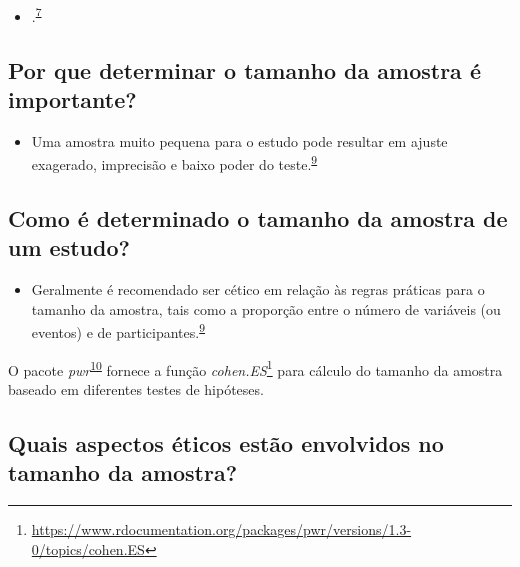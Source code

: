 \documentclass[
  a4paper,
]{book}
\providecommand{\tightlist}{%
  \setlength{\itemsep}{0pt}\setlength{\parskip}{0pt}}
\renewcommand{\href}[2]{#2\footnote{\url{#1}}}
\newenvironment{infobox}[1]
  {
  \begin{itemize}
  \renewcommand{\labelitemi}{
    \raisebox{-.7\height}[0pt][0pt]{
      {\setkeys{Gin}{width=3em,keepaspectratio}
        \texttt{[image: \#1]}}
    }
  }
  \setlength{\fboxsep}{1em}
  \begin{blackbox}
  \item
  }
  {
  \end{blackbox}
  \end{itemize}
  }
\begin{document}
\begin{itemize}
\tightlist
\item
  .\textsuperscript{\protect\hyperlink{ref-Banerjee2010}{7}}
\end{itemize}

\hypertarget{por-que-determinar-o-tamanho-da-amostra-uxe9-importante}{%
\subsection{Por que determinar o tamanho da amostra é importante?}\label{por-que-determinar-o-tamanho-da-amostra-uxe9-importante}}

\begin{itemize}
\tightlist
\item
  Uma amostra muito pequena para o estudo pode resultar em ajuste exagerado, imprecisão e baixo poder do teste.\textsuperscript{\protect\hyperlink{ref-van2022a}{9}}
\end{itemize}

\hypertarget{como-uxe9-determinado-o-tamanho-da-amostra-de-um-estudo}{%
\subsection{Como é determinado o tamanho da amostra de um estudo?}\label{como-uxe9-determinado-o-tamanho-da-amostra-de-um-estudo}}

\begin{itemize}
\tightlist
\item
  Geralmente é recomendado ser cético em relação às regras práticas para o tamanho da amostra, tais como a proporção entre o número de variáveis (ou eventos) e de participantes.\textsuperscript{\protect\hyperlink{ref-van2022a}{9}}
\end{itemize}

\begin{infobox}{images/Rlogo}
O pacote \emph{pwr}\textsuperscript{\protect\hyperlink{ref-pwr}{10}} fornece a função \href{https://www.rdocumentation.org/packages/pwr/versions/1.3-0/topics/cohen.ES}{\emph{cohen.ES}} para cálculo do tamanho da amostra baseado em diferentes testes de hipóteses.

\end{infobox}

\hypertarget{quais-aspectos-uxe9ticos-estuxe3o-envolvidos-no-tamanho-da-amostra}{%
\subsection{Quais aspectos éticos estão envolvidos no tamanho da amostra?}\label{quais-aspectos-uxe9ticos-estuxe3o-envolvidos-no-tamanho-da-amostra}}
\end{document}
